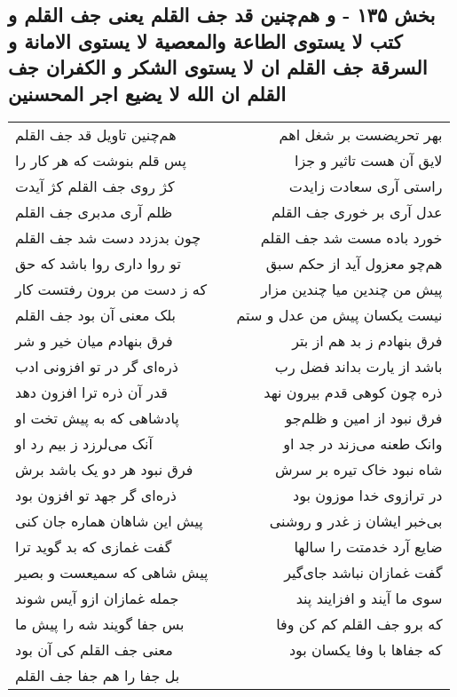 \begin{center}
\section*{بخش ۱۳۵ - و هم‌چنین قد جف القلم یعنی جف القلم و کتب لا یستوی الطاعة والمعصیة لا یستوی الامانة و السرقة جف القلم ان لا یستوی الشکر و الکفران جف القلم ان الله لا یضیع اجر المحسنین}
\label{sec:sh135}
\begin{longtable}{l p{0.5cm} r}
هم‌چنین تاویل قد جف القلم
&&
بهر تحریضست بر شغل اهم
\\
پس قلم بنوشت که هر کار را
&&
لایق آن هست تاثیر و جزا
\\
کژ روی جف القلم کژ آیدت
&&
راستی آری سعادت زایدت
\\
ظلم آری مدبری جف القلم
&&
عدل آری بر خوری جف القلم
\\
چون بدزدد دست شد جف القلم
&&
خورد باده مست شد جف القلم
\\
تو روا داری روا باشد که حق
&&
هم‌چو معزول آید از حکم سبق
\\
که ز دست من برون رفتست کار
&&
پیش من چندین میا چندین مزار
\\
بلک معنی آن بود جف القلم
&&
نیست یکسان پیش من عدل و ستم
\\
فرق بنهادم میان خیر و شر
&&
فرق بنهادم ز بد هم از بتر
\\
ذره‌ای گر در تو افزونی ادب
&&
باشد از یارت بداند فضل رب
\\
قدر آن ذره ترا افزون دهد
&&
ذره چون کوهی قدم بیرون نهد
\\
پادشاهی که به پیش تخت او
&&
فرق نبود از امین و ظلم‌جو
\\
آنک می‌لرزد ز بیم رد او
&&
وانک طعنه می‌زند در جد او
\\
فرق نبود هر دو یک باشد برش
&&
شاه نبود خاک تیره بر سرش
\\
ذره‌ای گر جهد تو افزون بود
&&
در ترازوی خدا موزون بود
\\
پیش این شاهان هماره جان کنی
&&
بی‌خبر ایشان ز غدر و روشنی
\\
گفت غمازی که بد گوید ترا
&&
ضایع آرد خدمتت را سالها
\\
پیش شاهی که سمیعست و بصیر
&&
گفت غمازان نباشد جای‌گیر
\\
جمله غمازان ازو آیس شوند
&&
سوی ما آیند و افزایند پند
\\
بس جفا گویند شه را پیش ما
&&
که برو جف القلم کم کن وفا
\\
معنی جف القلم کی آن بود
&&
که جفاها با وفا یکسان بود
\\
بل جفا را هم جفا جف القلم

\end{longtable}
\end{center}
